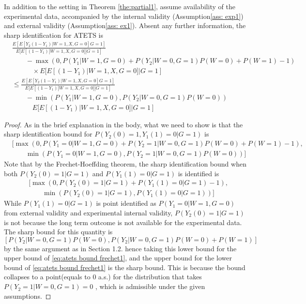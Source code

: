 \documentclass[uplatex,dvipdfmx]{jsarticle}
\begin{document}
\begin{theorem}
In addition to the setting in Theorem \ref{the:partial1}, assume availability of the experimental data, accompanied by the internal validity (Assumption\ref{ass: exp1}) and external validity (Assumption\ref{ass: ex1}). Absent any further information, the sharp identification for ATETS is 
    \begin{align*}
        &\frac{ E[E[ Y_2(1 -Y_1)  |W=1,X,G=0 ] G=1]}{ E[ E[ (1 -Y_1) | W=1,X, G=0] | G=1] }\\
        &\qquad - \max(0,P(Y_1| W=1, G=0) +P(Y_2| W=0, G=1) P(W=0) + P(W=1)- 1)\\
        &\qquad\quad\times{ E[ E[ (1 -Y_1) | W=1,X, G=0] | G=1] }\\
        &\leq\frac{ E[E[ Y_2(1 -Y_1)  |W=1,X,G=0 ] G=1]}{ E[ E[ (1 -Y_1) | W=1,X, G=0] | G=1] } \\
        &\qquad- \min(P(Y_1| W=1, G=0) , P(Y_2| W=0, G=1) P(W=0) )\\
        &\qquad\quad{ E[ E[ (1 -Y_1) | W=1,X, G=0] | G=1] } 
    \end{align*}
\end{theorem}
\begin{proof}
    As in the brief explanation in the body, what we need to show is that the sharp identification bound for $P( Y_2(0) =1, Y_1(1)=0|G=1)$ is  
    \begin{align*}
        &\biggl[\max(0,P(Y_1=0| W=1, G=0) +P(Y_2=1| W=0, G=1) P(W=0) + P(W=1)- 1) ,\\
        &\qquad\min(P(Y_1=0| W=1, G=0) , P(Y_2=1| W=0, G=1) P(W=0) )\biggr]
    \end{align*}
    Note that by the Frechet-Hoeffding theorem, the sharp identification bound
    when both $P( Y_2(0) =1|G=1)$ and $P(  Y_1(1)=0|G=1)$ is identified is 
    \begin{align}\label{eq:atets bound frechet1}
        &[ \max(0, P(Y_2(0)=1|G=1)+P(Y_1(1)=0|G=1) -1),\\
        &\qquad \min( P(Y_2(0)=1|G=1), P(Y_1(1)=0|G=1))]
    \end{align}
    While $P(Y_1(1)=0|G=1)$ is point identified as $P(Y_1 = 0 | W=1,G=0)$ from external validity and experimental internal validity, $P(Y_2(0)=1|G=1)$ is not because the long term outcome
    is not available for the experimental data. The sharp bound for this quantity is $[ P(Y_2| W=0, G=1)P(W=0),P(Y_2| W=0, G=1)P(W=0) + P(W=1)]$ by the same argument as in Section 1.2. hence taking this lower bound for the upper bound of \ref{eq:atets bound frechet1}, and the upper bound for the lower bound of \ref{eq:atets bound frechet1} 
    is the sharp bound. This is because the bound collapses to a point(equals to 0 a.s.) for the distribution that takes $P(Y_2=1|W=0,G=1)=0$ , which is admissible under the given assumptions.
\end{proof}
\end{document}
